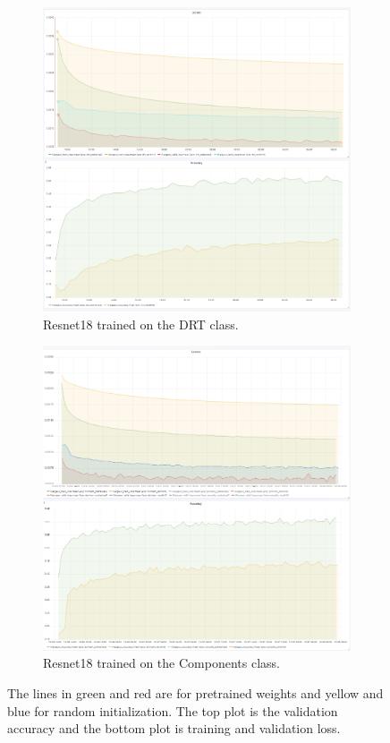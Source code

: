 \begin{figure}
\begin{subfigure}{.5\textwidth}
  \centering
  \includegraphics[width=.8\linewidth]{figures/04-Init_drt_acc.PNG}
  \caption{Resnet18 trained on the DRT class.}
  \label{fig:resinit_drt}
\end{subfigure}%
\begin{subfigure}{.5\textwidth}
  \centering
  \includegraphics[width=.8\linewidth]{figures/04-Init_dunham_acc.PNG}
  \caption{Resnet18 trained on the Components class.}
  \label{fig:resinit_compo}
\end{subfigure}
\caption{The lines in green and red are for pretrained weights and yellow and blue for random initialization. The top plot is the validation accuracy and the bottom plot is training  and validation loss.}
\label{fig:fig}
\end{figure}

